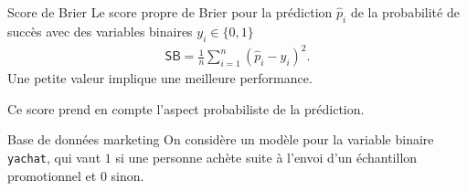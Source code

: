 \documentclass[
  ignorenonframetext,
]{beamer}
\newenvironment{Shaded}{\begin{snugshade}}{\end{snugshade}}
\newcommand{\AttributeTok}[1]{\textcolor[rgb]{0.40,0.45,0.13}{#1}}
\newcommand{\CommentTok}[1]{\textcolor[rgb]{0.37,0.37,0.37}{#1}}
\newcommand{\DecValTok}[1]{\textcolor[rgb]{0.68,0.00,0.00}{#1}}
\newcommand{\FunctionTok}[1]{\textcolor[rgb]{0.28,0.35,0.67}{#1}}
\newcommand{\NormalTok}[1]{\textcolor[rgb]{0.00,0.23,0.31}{#1}}
\newcommand{\OtherTok}[1]{\textcolor[rgb]{0.00,0.23,0.31}{#1}}
\newcommand{\SpecialCharTok}[1]{\textcolor[rgb]{0.37,0.37,0.37}{#1}}
\newcommand{\StringTok}[1]{\textcolor[rgb]{0.13,0.47,0.30}{#1}}
\begin{document}
\begin{frame}{Score de Brier}
\label{score-de-brier}
Le score propre de Brier pour la prédiction \(\widehat{p}_i\) de la
probabilité de succès avec des variables binaires \(y_i \in \{0, 1\}\)
\begin{align*}
\mathsf{SB} = \frac{1}{n} \sum_{i=1}^n (\widehat{p}_i - y_i)^2.
\end{align*} Une petite valeur implique une meilleure performance.

Ce score prend en compte l'aspect probabiliste de la prédiction.
\end{frame}

\begin{frame}[fragile]{Base de données marketing}
\label{base-de-donnuxe9es-marketing}
On considère un modèle pour la variable binaire \texttt{yachat}, qui
vaut \(1\) si une personne achète suite à l'envoi d'un échantillon
promotionnel et \(0\) sinon.

\begin{Shaded}
\end{Shaded}
\end{frame}
\end{document}
